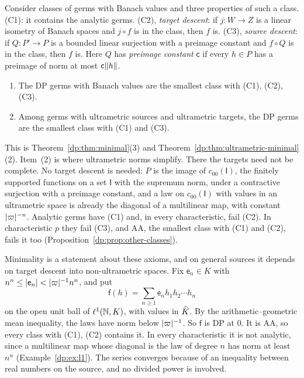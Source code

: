 Consider classes of germs with Banach values and three properties of such a class. (C1): it contains the analytic germs. (C2), \emph{target descent}: if $j\colon W\to Z$ is a linear isometry of Banach spaces and $j\circ f$ is in the class, then $f$ is. (C3), \emph{source descent}: if $Q\colon P'\to P$ is a bounded linear surjection with a preimage constant and $f\circ Q$ is in the class, then $f$ is. Here $Q$ has \emph{preimage constant} $\mathsf c$ if every $h\in P$ has a preimage of norm at most $\mathsf c\lVert h\rVert$.

\begin{introtheorem}\label{dp:intro:B}
\leavevmode
\begin{enumerate}
\item The DP germs with Banach values are the smallest class with \textup{(C1), (C2), (C3)}.
\item Among germs with ultrametric sources and ultrametric targets, the DP germs are the smallest class with \textup{(C1)} and \textup{(C3)}.
\end{enumerate}
\end{introtheorem}

This is Theorem~\ref{dp:thm:minimal}(3) and Theorem~\ref{dp:thm:ultrametric-minimal}(2). Item~(2) is where ultrametric norms simplify. There the targets need not be complete. No target descent is needed: $P$ is the image of $c_{00}(\mathsf I)$, the finitely supported functions on a set $\mathsf I$ with the supremum norm, under a contractive surjection with a preimage constant, and a law on $c_{00}(\mathsf I)$ with values in an ultrametric space is already the diagonal of a multilinear map, with constant $\lvert \varpi\rvert^{-n}$. Analytic germs have (C1) and, in every characteristic, fail (C2). In characteristic $p$ they fail (C3), and AA, the smallest class with (C1) and (C2), fails it too (Proposition~\ref{dp:prop:other-classes}).

Minimality is a statement about these axioms, and on general sources it depends on target descent into non-ultrametric spaces. Fix $\mathsf e_n\in K$ with $n^n\le\lvert \mathsf e_n\rvert<\lvert \varpi\rvert^{-1}n^n$, and put
\[
 \mathsf f(h)=\sum_{n\ge1}\mathsf e_nh_1h_2\cdots h_n
\]
on the open unit ball of $\ell^1(\mathbb N,K)$, with values in $\widehat K$. By the arithmetic--geometric mean inequality, the laws have norm below $\lvert \varpi\rvert^{-1}$. So $\mathsf f$ is DP at $0$. It is AA, so every class with (C1), (C2) contains it. In every characteristic it is not analytic, since a multilinear map whose diagonal is the law of degree $n$ has norm at least $n^n$ (Example~\ref{dp:ex:l1}). The series converges because of an inequality between real numbers on the source, and no divided power is involved.

